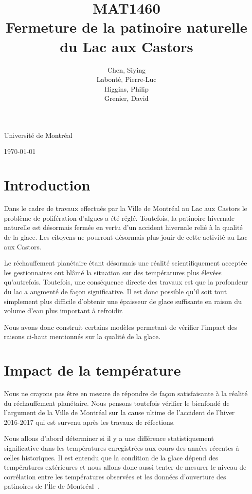 \documentclass[12pt]{article}
\title{MAT1460\\[3ex]Fermeture de la patinoire naturelle du Lac aux Castors}
\author{Chen, Siying\\[1ex] Labont\'e, Pierre-Luc\\[1ex]Higgins, Philip\\[1ex] Grenier, David}
\date{}
\numberwithin{figure}{section}
\numberwithin{table}{section}
\begin{document}
\maketitle
\thispagestyle{empty}
\vfill
\begin{center}
Universit\'e de Montr\'eal

\today
\end{center}
\clearpage

\tableofcontents
\clearpage
\section{Introduction}

Dans le cadre de travaux effectu\'es par la Ville de Montr\'eal au Lac aux Castors le probl\`eme de
polif\'eration d'algues a \'et\'e r\'egl\'e. Toutefois, la patinoire hivernale naturelle est
d\'esormais ferm\'ee en vertu d'un accident hivernale reli\'e \`a la qualit\'e de la glace. Les
citoyens ne pourront d\'esormais plus jouir de cette activit\'e au Lac aux Castors.

Le r\'echauffement plan\'etaire \'etant d\'esormais une r\'ealit\'e scientifiquement accept\'ee les
gestionnaires ont bl\^am\'e la situation sur des temp\'eratures plus \'elev\'ees qu'autrefois.
Toutefois, une cons\'equence directe des travaux est que la profondeur du lac a augment\'e de fa\c
con significative. Il est donc possible qu'il soit tout simplement plus difficile d'obtenir une
\'epaisseur de glace suffisante en raison du volume d'eau plus important \`a refroidir.

Nous avons donc construit certains mod\`eles permetant de v\'erifier l'impact des raisons
ci-haut mentionn\'es sur la qualit\'e de la glace.

\section{Impact de la temp\'erature}

Nous ne crayons pas \^etre en mesure de r\'epondre de fa\c con satisfaisante \`a la r\'ealit\'e du
r\'echauffement plan\'etaire. Nous pensons toutefois v\'erifier le bienfond\'e de l'argument de la
Ville de Montr\'eal sur la cause ultime de l'accident de l'hiver 2016-2017 qui est survenu apr\`es
les travaux de r\'efections.

Nous allons d'abord d\'eterminer si il y a une diff\'erence statistiquement significative dans les
temp\'eratures enregistr\'ees aux cours des ann\'ees r\'ecentes \`a celles historiques. Il est
entendu que la condition de la glace d\'epend des temp\'eratures ext\'erieures et nous allons donc
aussi tenter de mesurer le niveau de corr\'elation entre les temp\'eratures observ\'ees et les
donn\'ees d'ouverture des patinoires de l'\^Ile de Montr\'eal~\cite{PatHist}.
\end{document}
